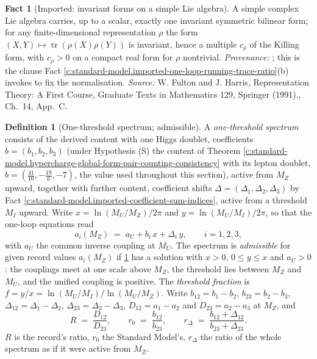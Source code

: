 \documentclass[11pt]{article}
\theoremstyle{definition}
\newtheorem{definition}[theorem]{Definition}
\newtheorem{fact}[theorem]{Fact}
\theoremstyle{plain}
\providecommand{\Dl}{}\renewcommand{\Dl}{\Delta}
\providecommand{\tr}{}\renewcommand{\tr}{\operatorname{tr}}
\begin{document}
\begin{fact}[Imported: invariant forms on a simple Lie algebra]\label{c:standard-model.imported-invariant-forms-simple-lie-algebra}
A simple complex Lie algebra carries, up to a scalar, exactly one invariant symmetric bilinear form; for any finite-dimensional representation $\rho$ the form $(X, Y) \mapsto \tr(\rho(X)\rho(Y))$ is invariant, hence a multiple $c_{\rho}$ of the Killing form, with $c_{\rho} > 0$ on a compact real form for $\rho$ nontrivial. \emph{Provenance:} \cite[Ch.~14, App.~C]{FultonHarris1991}; this is the clause Fact \ref{c:standard-model.imported-one-loop-running-trace-ratio}(b) invokes to fix the normalisation.
\emph{Source:} W. Fulton and J. Harris, Representation Theory: A First Course, Graduate Texts in Mathematics 129, Springer (1991)., Ch.~14, App.~C.
\end{fact}

\begin{definition}[One-threshold spectrum; admissible]\label{c:obj.standard-model.one-threshold-spectrum-admissible}
A \emph{one-threshold spectrum} consists of the derived content with one Higgs doublet, coefficients $b = (b_{1}, b_{2}, b_{3})$ (under Hypothesis (S) the content of Theorem \ref{c:standard-model.hypercharge-global-form-pair-counting-consistency} with its lepton doublet, $b = (\tfrac{41}{10}, -\tfrac{19}{6}, -7)$, the value used throughout this section), active from $M_{Z}$ upward, together with further content, coefficient shifts $\Dl = (\Dl_{1}, \Dl_{2}, \Dl_{3})$ by Fact \ref{c:standard-model.imported-coefficient-sum-indices}, active from a threshold $M_{I}$ upward. Write $x = \ln(M_{U}/M_{Z})/2\pi$ and $y = \ln(M_{U}/M_{I})/2\pi$, so that the one-loop equations read
\begin{equation}
a_{i}(M_{Z}) \;=\; a_{U} + b_{i}\,x + \Dl_{i}\,y, \qquad i = 1, 2, 3,
\end{equation}
with $a_{U}$ the common inverse coupling at $M_{U}$. The spectrum is \emph{admissible} for given record values $a_{i}(M_{Z})$ if \ref{c:obj.standard-model.one-threshold-spectrum-admissible} has a solution with $x > 0$, $0 \le y \le x$ and $a_{U} > 0$: the couplings meet at one scale above $M_{Z}$, the threshold lies between $M_{Z}$ and $M_{U}$, and the unified coupling is positive. The \emph{threshold fraction} is $f = y/x = \ln(M_{U}/M_{I})/\ln(M_{U}/M_{Z})$. Write $b_{12} = b_{1} - b_{2}$, $b_{23} = b_{2} - b_{3}$, $\Dl_{12} = \Dl_{1} - \Dl_{2}$, $\Dl_{23} = \Dl_{2} - \Dl_{3}$, $D_{12} = a_{1} - a_{2}$ and $D_{23} = a_{2} - a_{3}$ at $M_{Z}$, and
\[
R \;=\; \frac{D_{12}}{D_{23}}, \qquad r_{0} \;=\; \frac{b_{12}}{b_{23}}, \qquad r_{\Dl} \;=\; \frac{b_{12} + \Dl_{12}}{b_{23} + \Dl_{23}}.
\]
$R$ is the record's ratio, $r_{0}$ the Standard Model's, $r_{\Dl}$ the ratio of the whole spectrum as if it were active from $M_{Z}$.
\end{definition}
\end{document}
